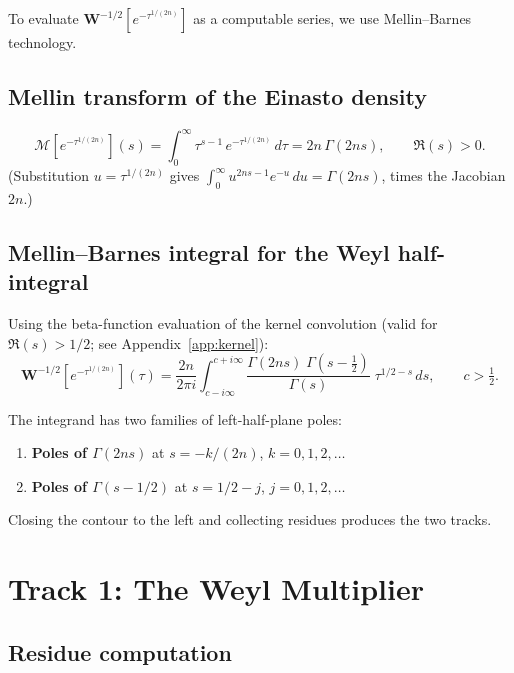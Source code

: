 \documentclass{article}
\begin{document}
To evaluate $\mathbf{W}^{-1/2}[e^{-\tau^{1/(2n)}}]$ as a computable series,
we use Mellin--Barnes technology.

\subsection{Mellin transform of the Einasto density}
\begin{equation}\label{eq:mellin-rho}
\mathcal{M}\!\left[e^{-\tau^{1/(2n)}}\right]\!(s)
= \int_0^\infty \tau^{s-1}\,e^{-\tau^{1/(2n)}}\,d\tau
= 2n\,\Gamma(2ns),\qquad \Re(s)>0.
\end{equation}
(Substitution $u = \tau^{1/(2n)}$ gives
$\int_0^\infty u^{2ns-1}e^{-u}\,du = \Gamma(2ns)$, times the Jacobian $2n$.)

\subsection{Mellin--Barnes integral for the Weyl half-integral}

Using the beta-function evaluation of the kernel convolution
(valid for $\Re(s)>1/2$; see Appendix~\ref{app:kernel}):
\begin{equation}\label{eq:MB}
\mathbf{W}^{-1/2}\!\left[e^{-\tau^{1/(2n)}}\right]\!(\tau)
= \frac{2n}{2\pi i}\int_{c-i\infty}^{c+i\infty}
\frac{\Gamma(2ns)\;\Gamma(s-\tfrac{1}{2})}{\Gamma(s)}\;
\tau^{1/2-s}\,ds,
\qquad c > \tfrac{1}{2}.
\end{equation}

The integrand has two families of left-half-plane poles:
\begin{enumerate}
\item \textbf{Poles of $\Gamma(2ns)$} at $s = -k/(2n)$, \; $k=0,1,2,\ldots$
\item \textbf{Poles of $\Gamma(s-1/2)$} at $s = 1/2-j$, \; $j=0,1,2,\ldots$
\end{enumerate}
Closing the contour to the left and collecting residues produces the two tracks.

\section{Track 1: The Weyl Multiplier}
\label{sec:track1}

\subsection{Residue computation}
\end{document}
